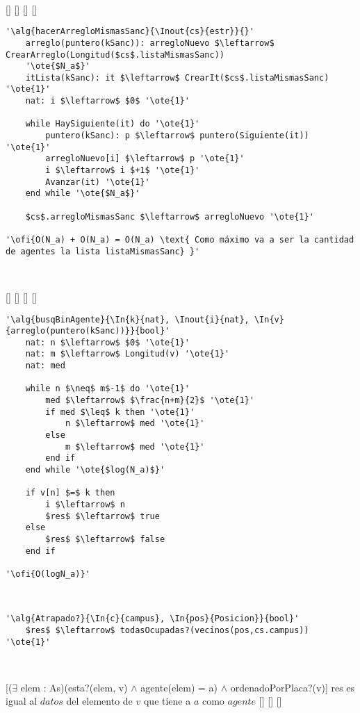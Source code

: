 ~


[]
{}
[]
[]
[]

\begin{lstlisting}[mathescape]
'\alg{hacerArregloMismasSanc}{\Inout{cs}{estr}}{}'
	arreglo(puntero(kSanc)): arregloNuevo $\leftarrow$ CrearArreglo(Longitud($cs$.listaMismasSanc))
	'\ote{$N_a$}'
	itLista(kSanc): it $\leftarrow$ CrearIt($cs$.listaMismasSanc) '\ote{1}'
	nat: i $\leftarrow$ $0$ '\ote{1}'

	while HaySiguiente(it) do '\ote{1}'
		puntero(kSanc): p $\leftarrow$ puntero(Siguiente(it)) '\ote{1}'
		arregloNuevo[i] $\leftarrow$ p '\ote{1}'
		i $\leftarrow$ i $+1$ '\ote{1}'
		Avanzar(it) '\ote{1}'
	end while '\ote{$N_a$}'

	$cs$.arregloMismasSanc $\leftarrow$ arregloNuevo '\ote{1}'

'\ofi{O(N_a) + O(N_a) = O(N_a) \text{ Como máximo va a ser la cantidad de agentes la lista listaMismasSanc} }'
\end{lstlisting}

~


[]
{}
[]
[]
[]

\begin{lstlisting}[mathescape]
'\alg{busqBinAgente}{\In{k}{nat}, \Inout{i}{nat}, \In{v}{arreglo(puntero(kSanc))}}{bool}'
	nat: n $\leftarrow$ $0$ '\ote{1}'
	nat: m $\leftarrow$ Longitud(v) '\ote{1}'
	nat: med

	while n $\neq$ m$-1$ do '\ote{1}'
		med $\leftarrow$ $\frac{n+m}{2}$ '\ote{1}'
		if med $\leq$ k then '\ote{1}'
			n $\leftarrow$ med '\ote{1}'
		else
			m $\leftarrow$ med '\ote{1}'
		end if
	end while '\ote{$log(N_a)$}'

	if v[n] $=$ k then
		i $\leftarrow$ n
		$res$ $\leftarrow$ true
	else
		$res$ $\leftarrow$ false
	end if

'\ofi{O(logN_a)}'
\end{lstlisting}

~


\begin{lstlisting}[mathescape]
'\alg{Atrapado?}{\In{c}{campus}, \In{pos}{Posicion}}{bool}'
	$res$ $\leftarrow$ todasOcupadas?(vecinos(pos,cs.campus)) '\ote{1}'
\end{lstlisting}

~


[($\exists$ elem : As)(esta?(elem, v) $\land$ agente(elem) = a) $\land$ ordenadoPorPlaca?(v)]
{res es igual al $datos$ del elemento de $v$ que tiene a $a$ como $agente$}
[]
[]
[]

